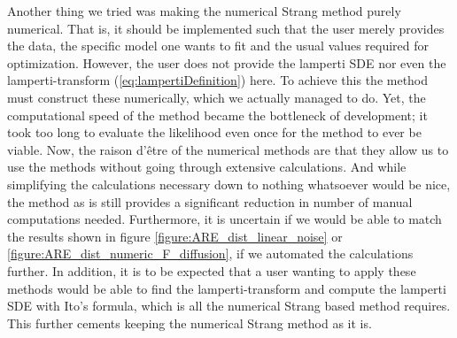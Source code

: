 Another thing we tried was making the numerical Strang method purely numerical. That is, it should be implemented such that the user merely provides the data, the specific model one wants to fit and the usual values required for optimization. However, the user does not provide the lamperti SDE nor even the lamperti-transform (\ref{eq:lampertiDefinition}) here. To achieve this the method must construct these numerically, which we actually managed to do. Yet, the computational speed of the method became the bottleneck of development; it took too long to evaluate the likelihood even once for the method to ever be viable. Now, the raison d'être of the numerical methods are that they allow us to use the methods without going through extensive calculations. And while simplifying the calculations necessary down to nothing whatsoever would be nice, the method as is still provides a significant reduction in number of manual computations needed. Furthermore, it is uncertain if we would be able to match the results shown in figure \ref{figure:ARE_dist_linear_noise} or \ref{figure:ARE_dist_numeric_F_diffusion}, if we automated the calculations further. In addition, it is to be expected that a user wanting to apply these methods would be able to find the lamperti-transform and compute the lamperti SDE with Ito's formula, which is all the numerical Strang based method requires. This further cements keeping the numerical Strang method as it is.

